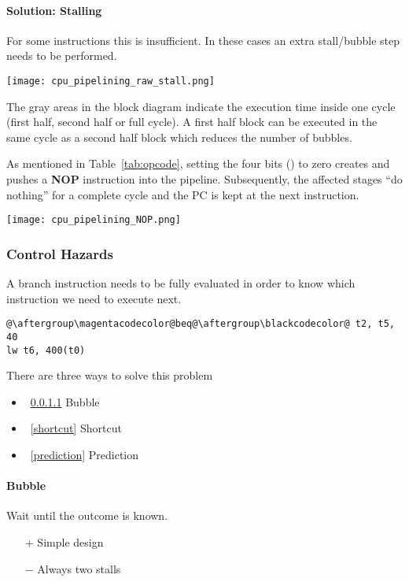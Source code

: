\paragraph{Solution: Stalling}
For some instructions this is insufficient. In these cases an extra stall/bubble step needs to be performed.

\texttt{[image: cpu\_pipelining\_raw\_stall.png]}

The gray areas in the block diagram indicate the execution time inside one cycle (first half, second half or full cycle). A first half block can be executed in the same cycle as a second half block which reduces the number of bubbles.

\newpar{}
As mentioned in Table~\ref{tab:opcode}, setting the four bits () to zero creates and pushes a \textbf{NOP} instruction into the pipeline.
Subsequently, the affected stages ``do nothing'' for a complete cycle and the PC is kept at the next instruction.
\begin{center}
    \texttt{[image: cpu\_pipelining\_NOP.png]}
\end{center}

\subsubsection{Control Hazards}\label{control hazards}

A branch instruction needs to be fully evaluated in order to know which instruction we need to execute next.

\begin{lstlisting}[escapechar=@]
@\aftergroup\magentacodecolor@beq@\aftergroup\blackcodecolor@ t2, t5, 40
lw t6, 400(t0)
\end{lstlisting}

There are three ways to solve this problem
\begin{itemize}
    \item~\ref{bubble} Bubble
    \item~\ref{shortcut} Shortcut
    \item~\ref{prediction} Prediction
\end{itemize}

\paragraph{Bubble}\label{bubble}

Wait until the outcome is known.
\begin{itemize}
    \item[+] Simple design
    \item[$-$] Always two stalls
\end{itemize}

